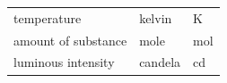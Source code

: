 {\begin{tabular}[t]{|l|l|l|}
    
        temperature &
    
    
        kelvin &
    
    
        K%
     \tabularnewline\cline{1-1}\cline{2-2}\cline{3-3}
    
    
        amount of substance &
    
    
        mole &
    
    
        mol%
     \tabularnewline\cline{1-1}\cline{2-2}\cline{3-3}
    
    
        luminous intensity &
    
    
        candela &
    
    
        cd%
     \tabularnewline\cline{1-1}\cline{2-2}\cline{3-3}
    \end{tabular}} %
      \addtocounter{footnote}{-0}
      
